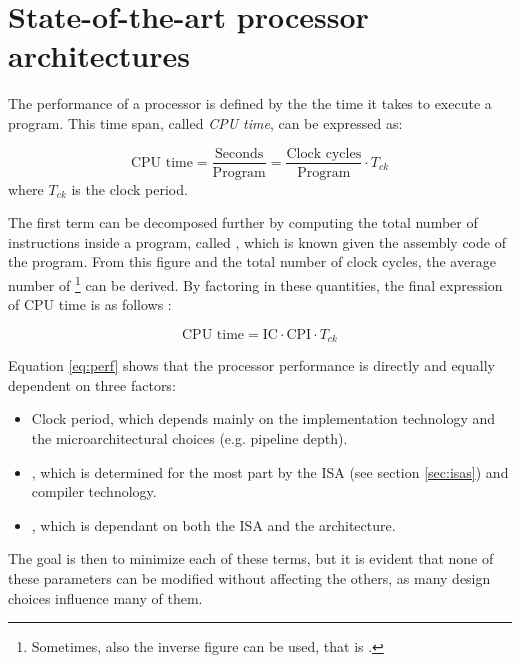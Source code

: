 \chapter{State-of-the-art processor architectures}
The performance of a processor is defined by the the time it takes to execute a program. This time span, called \emph{CPU time}, can be expressed as:

\begin{equation*}
  \text{CPU time} = \frac{\text{Seconds}}{\text{Program}} = \frac{\text{Clock cycles}}{\text{Program}} \cdot T_{ck}
\end{equation*}
where $T_{ck}$ is the clock period.

The first term can be decomposed further by computing the total number of instructions inside a program, called , which is known given the assembly code of the program. From this figure and the total number of clock cycles, the average number of \footnote{Sometimes, also the inverse figure can be used, that is .} can be derived. By factoring in these quantities, the final expression of CPU time is as follows \cite[p.~53]{hennessy17}:

\begin{equation}\label{eq:perf}
  \text{CPU time} = \text{IC} \cdot \text{CPI} \cdot T_{ck} 
\end{equation}

Equation \eqref{eq:perf} shows that the processor performance is directly and equally dependent on three factors:
\begin{itemize}
  \item Clock period, which depends mainly on the implementation technology and the microarchitectural choices (e.g. pipeline depth).
  \item {}, which is determined for the most part by the \ac{ISA} (see section \ref{sec:isas}) and compiler technology.
  \item {}, which is dependant on both the \ac{ISA} and the architecture.
\end{itemize}
The goal is then to minimize each of these terms, but it is evident that none of these parameters can be modified without affecting the others, as many design choices influence many of them.

